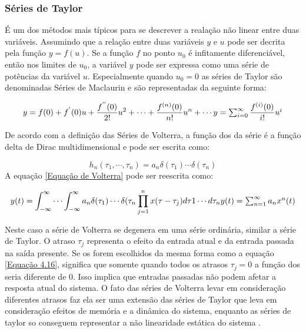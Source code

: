 \subsubsection*{Séries de Taylor}
É um dos métodos mais típicos para se descrever a realação não linear entre duas variáveis. Assumindo que a relação entre duas variáveis $y$ e $u$ pode ser decrita pela função $y = f(u)$. Se a função $f$ no ponto $u_{0}$ é infitamente diferenciável, então nos limites de $u_{0}$, a variável $y$ pode ser expressa como uma série de potências da variável $u$. Especialmente quando $u_{0} = 0$ as séries de Taylor são denominadas Séries de Maclaurin e são representadas da seguinte forma\cite{cheng2017volterra}:

\begin{equation}
y = f(0) + f^{'}(0)u + \dfrac{f^{''}(0)}{2!}u^{2}+\cdots+\dfrac{f^{(n)}(0)}{n!}u^{n}+\cdots$$
$$ y =\sum_{i=0}^{\infty} \dfrac{f^{(i)}(0)}{i!}u^{i}
\label{Equação 4.15}
\end{equation}

De acordo com a definição das Séries de Volterra, a função dos  da série é a função delta de Dirac multidimensional e pode ser escrita como:

\begin{equation}
h_{n}(\tau_{1},\cdots,\tau_{n})=a_{n}\delta(\tau_{1})\cdots\delta(\tau_{n})
\label{Equação 4.16}
\end{equation}
A equação \ref{Equação de Volterra} pode ser reescrita como:

\begin{equation}
y(t) = \int_{-\infty}^{\infty} \cdots \int_{-\infty}^{\infty} a_{n}\delta(\tau_{1})\cdots\delta(\tau_{n}\prod_{j=1}^{n}x(\tau - \tau_{j})d\tau1 \cdots d\tau_{n}$$
$$ y(t) = \sum_{n=1}^{\infty} a_{n}x^{n}(t)
\end{equation}

Neste caso a série de Volterra se degenera em uma série ordinária, similar a série de Taylor. O atraso $\tau_{j}$ representa o efeito da entrada atual e da entrada passada na saída presente. Se os  forem escolhidos da mesma forma como a equação \ref{Equação 4.16}, significa que somente quando todos os atrasos $\tau_{j} = 0$ a função dos  seria diferente de 0. Isso implica que entradas passadas não podem afetar a resposta atual do sistema. O fato das séries de Volterra levar em consideração diferentes atrasos faz ela ser uma extensão das séries de Taylor que leva em consideração efeitos de memória e a dinâmica do sistema, enquanto as séries de taylor so conseguem representar a não linearidade estática do sistema \cite{cheng2017volterra}.

